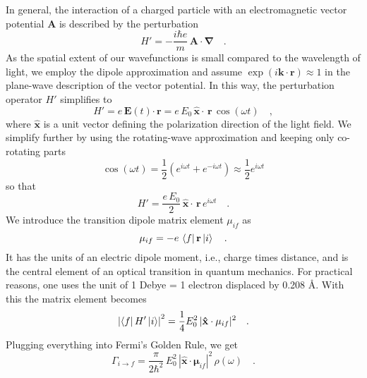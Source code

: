 In general, the interaction of a charged particle with an electromagnetic vector potential $\mathbf{A}$ is described by the perturbation
\begin{equation}
 H' = - \frac{i \hbar e}{m} \, \mathbf{A \cdot \nabla}  \quad .
\end{equation}
As the spatial extent of our wavefunctions is small compared to the wavelength of light, we employ the dipole approximation and assume $\exp( i \mathbf{k \cdot r}) \approx 1$ in the plane-wave description of the vector potential. In this way, the  perturbation operator $H'$ simplifies to
\begin{equation}
 H' =  e \, \mathbf{E} (t)  \mathbf{\cdot \, r} =  e \,E_0 \,  \mathbf{\hat{x} \cdot \, r} \, \cos(\omega t) \quad ,
\end{equation}
where $\mathbf{\hat{x}} $ is a unit vector defining the polarization direction of the light field. We simplify further by using the rotating-wave approximation and keeping only co-rotating parts 
\begin{equation}
 \cos(\omega t)
 = \frac{1}{2} \left( e^{i \omega t}+  e^{-i \omega t} \right)
 \approx  \frac{1}{2}  e^{i \omega t} 
\end{equation}
so that 
\begin{equation}
H' =  \frac{ e \,E_0}{2}  \,  \mathbf{\hat{x} \cdot \, r} \,  e^{i \omega t}  \quad .
\end{equation}
%
 We introduce the transition dipole matrix element $\mu_{if}$ as
\begin{equation}
\mathbf{\mu}_{if} = -e \, \bra{f}    \mathbf{r} \ket{i}  \quad .
\end{equation}
It has the units of an electric dipole moment, i.e., charge times distance, and is the central element of an optical transition in quantum mechanics. For practical reasons, one uses the unit of 1 Debye = 1 electron displaced by 0.208 \AA.
With this the matrix element  becomes
\begin{equation}
\left| \bra{f} H' \ket{i} \right|^2 =  \frac{1}{4} E_0^2  \, |\mathbf{\hat{x}} \cdot \mathbf{\mu}_{if} |^2 \quad .
\end{equation}
Plugging everything into Fermi's Golden Rule, we get
\begin{equation}
 \Gamma_{i \rightarrow f} = \frac{\pi}{2 \hbar^2} \,  E_0^2  \, |\mathbf{\hat{x}} \cdot \mathbf{\mu}_{if} |^2 \, \rho(\omega) \quad .
\end{equation}
